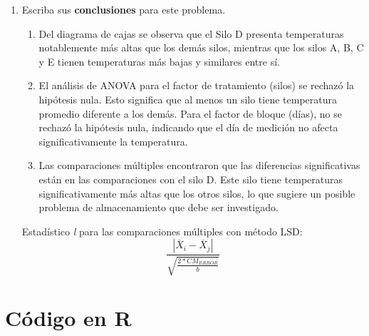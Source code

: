 \documentclass[12pt,a4paper]{article}
\begin{document}
\begin{enumerate}
  \item Escriba sus \textbf{conclusiones} para este problema.
  \begin{enumerate}
    \item Del diagrama de cajas se observa que el Silo D presenta temperaturas notablemente más altas que los demás silos, mientras que los silos A, B, C y E tienen temperaturas más bajas y similares entre sí.
    \item El análisis de ANOVA para el factor de tratamiento (silos) se rechazó la hipótesis nula. Esto significa que al menos un silo tiene temperatura promedio diferente a los demás. Para el factor de bloque (días), no se rechazó la hipótesis nula, indicando que el día de medición no afecta significativamente la temperatura.
    \item Las comparaciones múltiples encontraron que las diferencias significativas están en las comparaciones con el silo D. Este silo tiene temperaturas significativamente más altas que los otros silos, lo que sugiere un posible problema de almacenamiento que debe ser investigado.
  \end{enumerate}

  Estadístico \textit{l} para las comparaciones múltiples con método LSD:
  \[
    \frac{|\overline{X}_i - \overline{X}_j|}{\sqrt{\frac{2*CM_{ERROR}}{b}}}
  \]

\end{enumerate}

\newpage
\section*{Código en R}
\end{document}
